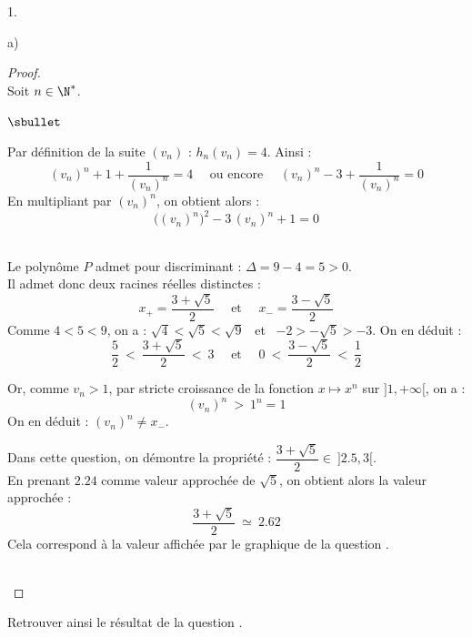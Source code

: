 \documentclass[11pt]{article}%
\begin{document}
\begin{noliste}{1.}
\begin{noliste}{a)}
    \begin{proof}~\\%
      Soit $n \in \N^*$.
      \begin{noliste}{$\sbullet$}
      \item Par définition de la suite $(v_n)$ : $h_n(v_n) = 4$. Ainsi
        :
        \[
        (v_n)^n + 1 + \dfrac{1}{(v_n)^n} = 4 \quad \text{ ou encore }
        \quad (v_n)^n - 3 + \dfrac{1}{(v_n)^n} = 0
        \]
        En multipliant par $(v_n)^n$, on obtient alors : 
        \[
        \big( (v_n)^n \big)^2 - 3 \, (v_n)^n + 1 = 0
        \]
        ~

      \item Le polynôme $P$ admet pour discriminant : $\Delta = 9 - 4
        = 5 > 0$.\\
        Il admet donc deux racines réelles distinctes :
        \[
        x_+ = \dfrac{3 + \sqrt{5}}{2} \quad \text{ et } \quad x_- =
        \dfrac{3 - \sqrt{5}}{2}
        \]
        Comme $4 < 5 < 9$, on a : $\sqrt{4} < \sqrt{5} < \sqrt{9}$ \
        et \ $-2 > - \sqrt{5} > -3$. On en déduit :
        \[
        \dfrac{5}{2} \ < \ \dfrac{3 + \sqrt{5}}{2} \ < \ 3 \quad
        \text{ et } \quad 0 \ < \ \dfrac{3 - \sqrt{5}}{2} \ < \
        \dfrac{1}{2}
        \]


        \newpage


      \item Or, comme $v_n > 1$, par stricte croissance de la fonction
        $x \mapsto x^n$ sur $]1, +\infty[$, on a : 
        \[
        (v_n)^n \ > \ 1^n = 1
        \]
        On en déduit : $(v_n)^n \neq x_-$. %
      \end{noliste}
      \begin{remark}
        Dans cette question, on démontre la propriété :
        $\dfrac{3+\sqrt{5}}{2} \in \ ]2.5, 3[$.\\
        En prenant $2.24$ comme valeur approchée de $\sqrt{5}$, on
        obtient alors la valeur approchée :
        \[
        \dfrac{3 + \sqrt{5}}{2} \ \simeq \ 2.62
        \]
        Cela correspond à la valeur affichée par le graphique de la
        question .
      \end{remark}~\\[-1.2cm]
    \end{proof}

  \item Retrouver ainsi le résultat de la question .


\end{noliste}
\end{noliste}
\end{document}
